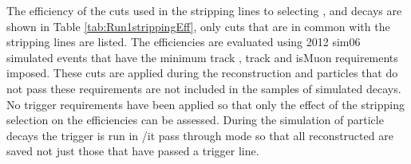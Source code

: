 The efficiency of the cuts used in the stripping lines to selecting \bmumu, \bhh and \bujpsik decays are shown in Table \ref{tab:Run1strippingEff}, only cuts that are in common with the \bmumu stripping lines are listed. The efficiencies are evaluated using 2012 sim06 simulated events that have the minimum track \pt, track  and isMuon requirements imposed. These cuts are applied during the reconstruction and particles that do not pass these requirements are not included in the samples of simulated decays. No trigger requirements have been applied so that only the effect of the stripping selection on the efficiencies can be assessed. During the simulation of particle decays the trigger is run in {/it pass through} mode so that all reconstructed are saved not just those that have passed a trigger line. 


